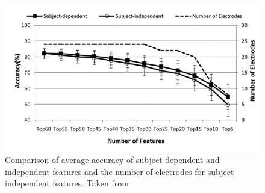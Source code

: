 \begin{figure}[h!]
\includegraphics[width=12cm]{img/related_work/lin_features_ranking.png}
\centering
\caption{Comparison of average accuracy of subject-dependent and independent features and the number of electrodes for subject-independent features. Taken from \cite{lin_eeg-based_2010}}\label{fig_lin_features_ranking}
\end{figure}

